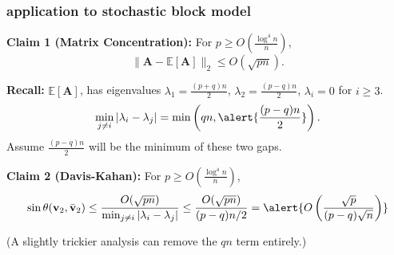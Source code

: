 \documentclass[compress]{beamer}
\newcommand{\bv}[1]{\mathbf{#1}}
\newcommand{\E}{\mathbb{E}}
\newcommand{\norm}[1]{\|#1\|}
\begin{document}
\begin{frame}
	\frametitle{application to stochastic block model}
	\small
	\textbf{Claim 1 (Matrix Concentration):} For $p \ge O\left (\frac{\log^4 n}{n}\right)$, 
	$$\norm{\bv A-\E[\bv{A}]}_2 \le O(\sqrt{pn}).$$

	\begin{tcolorbox}[colback=gray!5,colframe=gray!40!black]
		\textbf{Recall:} $\E[\bv{A}]$, has eigenvalues $\lambda_1 = \frac{(p+q)n}{2}$, $\lambda_2 = \frac{(p-q)n}{2}$, $\lambda_i = 0$ for $i \ge 3$.
			\begin{align*}
			\min_{j \neq i} |\lambda_i - \lambda_j| = \min \left ({qn}, \alert{\frac{(p-q) n}{2}} \right).
			\end{align*}
		Assume $\frac{(p-q) n}{2}$ will be the minimum of these two gaps.
		\end{tcolorbox}
	
	\textbf{Claim 2 (Davis-Kahan):} For $p \ge O\left (\frac{\log^4 n}{n}\right)$, 
	$$\sin \theta(\bv{v}_2,\bar{\bv{v}}_2) \le \frac{O(\sqrt{pn})}{\min_{j \neq i} |\lambda_i - \lambda_j|} \le \frac{O(\sqrt{p n})}{(p-q)n/2} = \alert{O\left (\frac{\sqrt{p}}{(p-q)\sqrt{n}} \right )}
	$$
	
(A slightly trickier analysis can remove the $qn$ term entirely.)
\end{frame}
\end{document}
